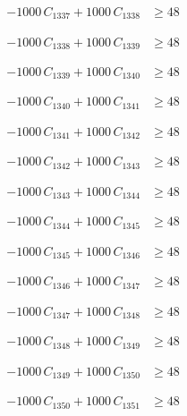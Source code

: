\documentclass[a4paper,11pt]{article}
\begin{document}
\begin{align}
-1000\,C_{1337} + 1000\,C_{1338} &\geq 48 \nonumber
\end{align}

\begin{align}
-1000\,C_{1338} + 1000\,C_{1339} &\geq 48 \nonumber
\end{align}

\begin{align}
-1000\,C_{1339} + 1000\,C_{1340} &\geq 48 \nonumber
\end{align}

\begin{align}
-1000\,C_{1340} + 1000\,C_{1341} &\geq 48 \nonumber
\end{align}

\begin{align}
-1000\,C_{1341} + 1000\,C_{1342} &\geq 48 \nonumber
\end{align}

\begin{align}
-1000\,C_{1342} + 1000\,C_{1343} &\geq 48 \nonumber
\end{align}

\begin{align}
-1000\,C_{1343} + 1000\,C_{1344} &\geq 48 \nonumber
\end{align}

\begin{align}
-1000\,C_{1344} + 1000\,C_{1345} &\geq 48 \nonumber
\end{align}

\begin{align}
-1000\,C_{1345} + 1000\,C_{1346} &\geq 48 \nonumber
\end{align}

\begin{align}
-1000\,C_{1346} + 1000\,C_{1347} &\geq 48 \nonumber
\end{align}

\begin{align}
-1000\,C_{1347} + 1000\,C_{1348} &\geq 48 \nonumber
\end{align}

\begin{align}
-1000\,C_{1348} + 1000\,C_{1349} &\geq 48 \nonumber
\end{align}

\begin{align}
-1000\,C_{1349} + 1000\,C_{1350} &\geq 48 \nonumber
\end{align}

\begin{align}
-1000\,C_{1350} + 1000\,C_{1351} &\geq 48 \nonumber
\end{align}
\end{document}
